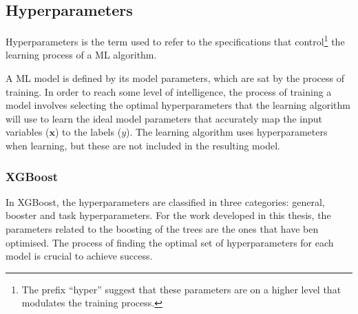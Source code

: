 \subsection{Hyperparameters}
\label{fig:Appendix:BDT:Hyperparams}
Hyperparameters is the term used to refer to the specifications that control\footnote{The prefix ``hyper'' suggest that 
these parameters are on a higher level that modulates the training process.}
 the learning process of a ML algorithm. 

A ML model is defined by its model parameters, which are sat by the process of training. 
In order to reach some level of intelligence, the process of training a model involves 
selecting the optimal hyperparameters that the learning algorithm will use to learn the
ideal model parameters that accurately map the input variables ($\bm{x}$) to the labels ($y$).
The learning algorithm uses hyperparameters when learning, but these are not included 
in the resulting model. 

\subsubsection{XGBoost}
In XGBoost, the hyperparameters are classified in three categories: general, booster and task hyperparameters.
For the work developed in this thesis, the parameters related to the boosting of the trees are the ones
that have ben optimised. The process of finding the optimal set of hyperparameters for each model
is crucial to achieve success. 

